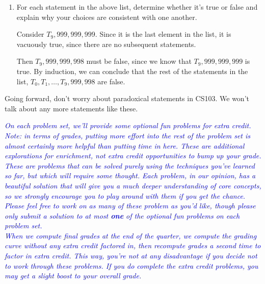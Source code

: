 \documentclass{article}
\renewcommand{\(}{\left(}
\renewcommand{\)}{\right)}
\newcommand{\annotate}[1]{\textit{\textcolor{blue}{#1}}}
\theoremstyle{plain}
\theoremstyle{plain}
\theoremstyle{definition}
\begin{document}
\begin{enumerate}[resume*]

\item For each statement in the above list,
determine whether it's true or false and explain why
your choices are consistent with one another.

\begin{shaded}
Consider $T_9,999,999,999$. Since it is the last element in the list, it is vacuously true, since there are no subsequent statements.

Then $T_9,999,999,998$ must be false, since we know that $T_9,999,999,999$ is true. By induction, we can conclude that the rest of the statements in the list, $T_0, T_1, \ldots, T_9,999,998$ are false.
\end{shaded}

\end{enumerate}

Going forward, don't worry about paradoxical statements in CS103.
We won't talk about any more statements like these.
\smiley

\pagebreak



\annotate{On each problem set, we'll provide some optional fun problems for extra credit. Note: in terms of grades, putting more effort into the rest of the problem set is almost certainly more helpful than putting time in here. These are additional explorations for enrichment, not extra credit opportunities to bump up your grade. These are problems that can be solved purely using the techniques you've learned so far, but which will require some thought. Each problem, in our opinion, has a beautiful solution that will give you a much deeper understanding of core concepts, so we strongly encourage you to play around with them if you get the chance. Please feel free to work on as many of these problem as you'd like, though please only submit a solution to at most {\bf one} of the optional fun problems on each problem set.} \\

\annotate{When we compute final grades at the end of the quarter, we compute the grading curve without any extra credit factored in, then recompute grades a second time to factor in extra credit. This way, you're not at any disadvantage if you decide not to work through these problems. If you do complete the extra credit problems, you may get a slight boost to your overall grade.} \\
\end{document}
